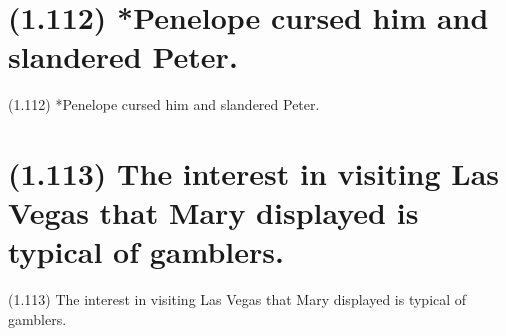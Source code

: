 \documentclass{article}
\begin{document}
\section*{(1.112) *Penelope cursed him and slandered Peter.}

\bigbreak
\begin{enumerate*}
\item[(1.112)] *Penelope cursed him and slandered Peter.
\end{enumerate*}
\bigbreak

\bigbreak
\begin{minipage}{\textwidth}
\end{minipage}
\bigbreak

\clearpage

%
%

\section*{(1.113) The interest in visiting Las Vegas that Mary displayed is typical of gamblers.}

\bigbreak
\begin{enumerate*}
\item[(1.113)] The interest in visiting Las Vegas that Mary displayed is typical of gamblers.
\end{enumerate*}
\bigbreak
\end{document}
